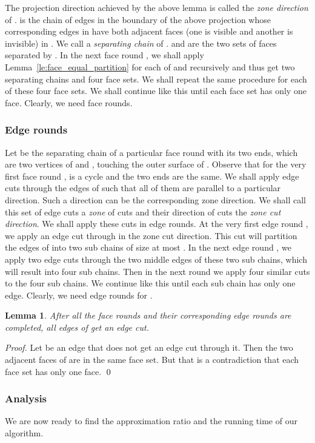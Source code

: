 \documentclass{llncs}
\newtheorem{lem}{Lemma}
\begin{document}
The projection direction achieved by the above lemma is called the \emph{zone direction} of .
 is the chain of edges in the boundary of the above projection
whose corresponding edges in  have both adjacent faces (one is visible and another is invisible) in .
We call  a \emph{separating chain} of .
 and  are the two sets of faces separated by .
In the next face round , we shall apply Lemma~\ref{le:face_equal_partition} for each of  and 
recursively and thus get two separating chains and four  face sets.
We shall repeat the same procedure for each of these four face sets.
We shall continue like this until each face set has only one face.
Clearly, we need  face rounds.

\subsubsection{Edge rounds}
Let  be the separating chain of a particular face round
with its two ends, which are two vertices of  and , touching the outer surface of .
Observe that for the very first face round ,  is a cycle and the two ends are the same.
We shall apply edge cuts through the edges of  such that all of them are parallel to a particular direction.
Such a direction can be the corresponding zone direction.
We shall call this set of  edge cuts a \emph{zone} of cuts and their direction of cuts the \emph{zone cut direction}.
We shall apply these cuts in  edge rounds.
At the very first edge round , we apply an edge cut through  in the zone cut direction.
This cut will partition the edges of  into two sub chains of size at most . 
In the next edge round , we apply two edge cuts through the two middle edges of these two sub chains,
which will result into four sub chains.
Then in the next round we apply four similar cuts to the four sub chains.
We continue like this until each sub chain has only one edge.
Clearly, we need  edge rounds for . 

\begin{lem}
After all the face rounds and their corresponding edge rounds are completed, all edges of  get an edge cut.
\end{lem}

\begin{proof}
Let  be an edge that does not get an edge cut through it. 
Then the two adjacent faces of  are in the same face set.
But that is a contradiction that each face set has only one face.
\qed
\end{proof}


\subsubsection{Analysis}
We are now ready to find the approximation ratio and the running time of our algorithm.
\end{document}
